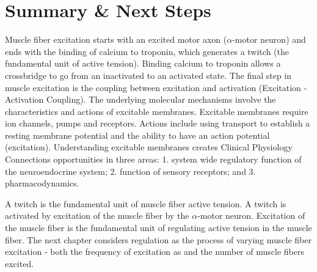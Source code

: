 \section{Summary \& Next Steps}

Muscle fiber excitation starts with an excited motor axon ($\alpha$-motor neuron) and ends with the binding of calcium to troponin, which generates a twitch (the fundamental unit of active tension). Binding calcium to troponin allows a crossbridge to go from an inactivated to an activated state. The final step in muscle excitation is the coupling between excitation and activation (Excitation - Activation Coupling). The underlying molecular mechanisms involve the characteristics and actions of excitable membranes. Excitable membranes require ion channels, pumps and receptors. Actions include using transport to establish a resting membrane potential and the ability to have an action potential (excitation). Understanding excitable membranes creates Clinical Physiology Connections opportunities in three areas: 1. system wide regulatory function of the neuroendocrine system; 2. function of sensory receptors; and 3. pharmacodynamics.

A twitch is the fundamental unit of muscle fiber active tension. A twitch is activated by excitation of the muscle fiber by the $\alpha$-motor neuron. Excitation of the muscle fiber is the fundamental unit of regulating active tension in the muscle fiber. The next chapter considers regulation as the process of varying muscle fiber excitation - both the frequency of excitation as and the number of muscle fibers excited.


\printbibliography[heading=subbibintoc]



